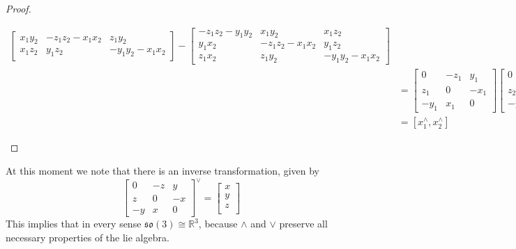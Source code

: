 \documentclass[a4paper]{article}
\begin{document}
\begin{proof}
\begin{enumerate}
\[\begin{aligned}
\begin{bmatrix}
        x_1y_2 &-z_1z_2 - x_1x_2 & z_1y_2 \\
        x_1z_2 & y_1z_2 & -y_1y_2 - x_1x_2
      \end{bmatrix} -
      \begin{bmatrix}
        -z_1z_2 - y_1y_2 & x_1y_2 & x_1z_2 \\ 
        y_1x_2 & -z_1z_2 - x_1x_2 & y_1z_2 \\
        z_1x_2 & z_1y_2 & -y_1y_2 - x_1x_2
      \end{bmatrix}
      \\
      &= \begin{bmatrix}
      0 & -z_1 & y_1 \\
      z_1 & 0 & -x_1 \\
      -y_1 & x_1 & 0
    \end{bmatrix}
    \begin{bmatrix}
      0 & -z_2 & y_2 \\
      z_2 & 0 & -x_2 \\
      -y_2 & x_2 & 0
    \end{bmatrix} -
    \begin{bmatrix}
      0 & -z_2 & y_2 \\
      z_2 & 0 & -x_2 \\
      -y_2 & x_2 & 0
    \end{bmatrix} 
    \begin{bmatrix}
      0 & -z_1 & y_1 \\
      z_1 & 0 & -x_1 \\
      -y_1 & x_1 & 0
    \end{bmatrix} \\
    &= [x_1^{\wedge}, x_2^{\wedge}]
    \end{aligned}
      \]
  \end{enumerate}
\end{proof}
At this moment we note that there is an inverse transformation, given by 
\[
  \begin{bmatrix}
    0 & -z & y \\
    z & 0 & -x \\
    -y & x & 0
  \end{bmatrix}^{\vee} =
  \begin{bmatrix}
    x \\
    y \\
    z \\
  \end{bmatrix}
\]
This implies that in every sense $\mathfrak{so}(3) \cong \mathds{R}^{3}$, because $\wedge$ and $\vee$ preserve all necessary properties of the lie algebra.
  
\end{document}
